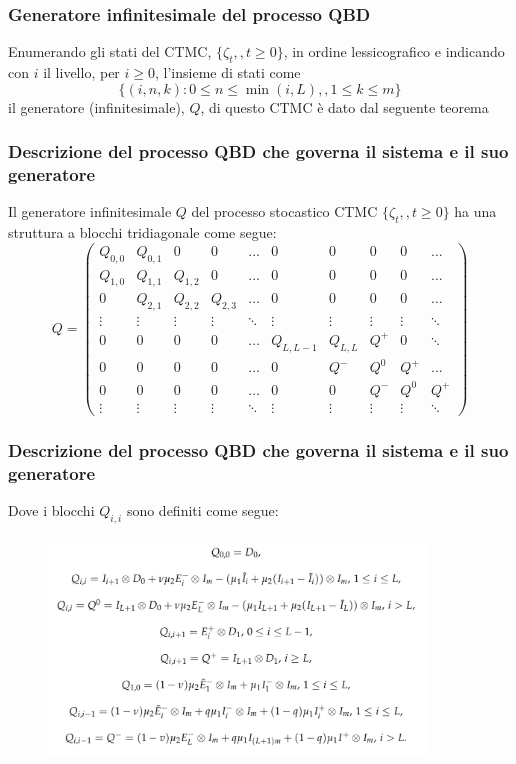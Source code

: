 \documentclass{beamer}
\begin{document}
\begin{frame}
    \frametitle{Generatore infinitesimale del processo QBD}
    Enumerando gli stati del CTMC, $\{\zeta_t,,t\geq 0\}$, in ordine lessicografico e indicando con $i$ il livello, per $i\geq 0$, l'insieme di stati come
    $$\{(i,n,k):0\leq n\leq \min(i,L),,1\leq k\leq m\}$$
    il generatore (infinitesimale), $Q$, di questo CTMC è dato dal seguente teorema
\end{frame}


\begin{frame}
    \frametitle{Descrizione del processo QBD che governa il sistema e il suo generatore}
    \begin{theorem}
        Il generatore infinitesimale $Q$ del processo stocastico CTMC $\{\zeta_t,,t\geq 0\}$ ha una struttura a blocchi tridiagonale come segue:
        \begin{equation*}
            Q =
            \begin{pmatrix}
                Q_{0,0} & Q_{0,1} & 0 & 0 & \dots & 0 & 0& 0 & 0 & \dots \\
                Q_{1,0} & Q_{1,1} & Q_{1,2} & 0 & \dots & 0 & 0 & 0 & 0 & \dots \\
                0 & Q_{2,1} & Q_{2,2} & Q_{2,3} & \dots & 0 & 0 & 0 & 0 & \dots \\
                \vdots & \vdots & \vdots & \vdots & \ddots & \vdots & \vdots & \vdots & \vdots & \ddots \\
                0 & 0 & 0 & 0 & \dots & Q_{L,L-1} & Q_{L,L} & Q^+& 0 & \ddots \\
                0 & 0 & 0 & 0 & \dots & 0 & Q^- & Q^0 & Q^+ & \dots \\
                0 & 0 & 0 & 0 & \dots & 0 & 0 & Q^- & Q^0 & Q^+ \\
                \vdots & \vdots & \vdots & \vdots & \ddots & \vdots & \vdots & \vdots & \vdots & \ddots
            \end{pmatrix}
        \end{equation*}
    \end{theorem}
\end{frame}


\begin{frame}
    \frametitle{Descrizione del processo QBD che governa il sistema e il suo generatore}
    Dove i blocchi $Q_{i,i}$ sono definiti come segue:
    \begin{figure}[h]
        \centering
        \includegraphics[width=0.9\textwidth]{T9RIVqa.png}
    \end{figure}
\end{frame}
\end{document}
